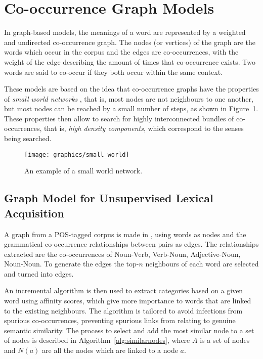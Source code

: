 \section{Co-occurrence Graph Models}
\label{sec:co-occurrence}

In graph-based models, the meanings of a word are represented by a weighted
and undirected co-occurrence graph. The nodes (or vertices) of the graph are the
words which occur in the corpus and the edges are co-occurrences, with the
weight of the edge describing the amount of times that co-occurrence exists. Two
words are said to co-occur if they both occur within the same context.

These models are based on the idea that co-occurrence graphs have the properties
of \textit{small world networks} \cite{veronis2004hyperlex}, that is, most nodes
are not neighbours to one another, but most nodes can be reached by a small
number of steps, as shown in Figure~\ref{fig:small-world}. These properties
then allow to search for highly interconnected bundles of co-occurrences, that
is, \textit{high density components}, which correspond to the senses being
searched.

\begin{figure}[ht]
 \caption{An example of a small world network.}
 \label{fig:small-world}
 \centering
 \texttt{[image: graphics/small\_world]}
\end{figure}

\subsection{Graph Model for Unsupervised Lexical Acquisition}

A graph from a \ac{POS}-tagged corpus is made in \cite{widdows2002graph}, using
words as nodes and the grammatical co-occurrence relationships between pairs as
edges. The relationships extracted are the co-occurrences of Noun-Verb,
Verb-Noun, Adjective-Noun, Noun-Noun. To generate the edges the top-$n$
neighbours of each word are selected and turned into edges.

An incremental algorithm is then used to extract categories based on a given
word using affinity scores, which give more importance to words that are linked
to the existing neighbours. The algorithm is tailored to avoid infections from
spurious co-occurrences, preventing spurious links from relating to genuine
semantic similarity. The process to select and add the most similar node to a
set of nodes is described in Algorithm~\ref{alg:similarnodes}, where $A$ is a
set of nodes and $N(a)$ are all the nodes which are linked to a node $a$.


